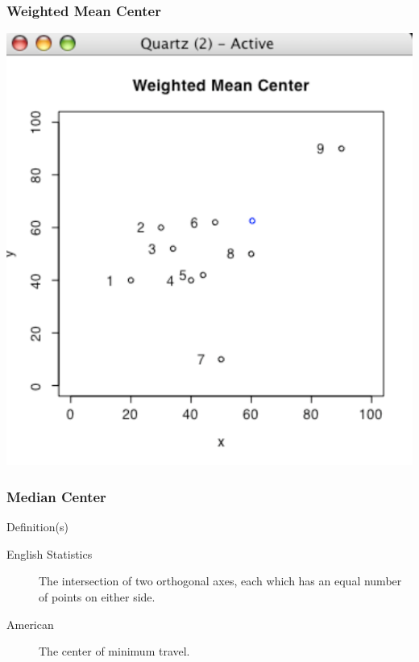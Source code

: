 \documentclass[nototal]{beamer}
\begin{document}
\begin{frame}
   \frametitle{Weighted Mean Center}
   \begin{center}
     \includegraphics[width=.65\linewidth]{weightedmeancenter}
   \end{center}
 \end{frame}



  \begin{frame}
    \frametitle{Median Center}
    \begin{block}{Definition(s)}
      \begin{description}
	\item[English Statistics] The intersection of two orthogonal axes,
	  each which has an equal number of points on either side.
	\item[American] The center of minimum travel.
      \end{description}
     \end{block}
   \end{frame}
\end{document}
